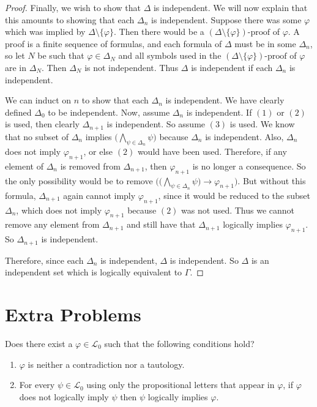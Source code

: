 \documentclass[12pt]{article}
\newenvironment{exercise}[2][Exercise]{\begin{trivlist}
\item[\hskip \labelsep {\bfseries #1}\hskip \labelsep {\bfseries #2.}]}{\end{trivlist}}
\begin{document}
\begin{proof}
Finally, we wish to show that $\Delta$ is independent.  We will now explain that this amounts to showing that each $\Delta_n$ is independent.  Suppose there was some $\varphi$ which was implied by $\Delta \setminus \{ \varphi \}$.  Then there would be a $(\Delta \setminus \{ \varphi \}) \textrm{-proof}$ of $\varphi$.  A proof is a finite sequence of formulas, and each formula of $\Delta$ must be in some $\Delta_n$, so let $N$ be such that $\varphi \in \Delta_N$ and all symbols used in the $(\Delta \setminus \{ \varphi \}) \textrm{-proof}$ of $\varphi$ are in $\Delta_N$.  Then $\Delta_N$ is not independent.  Thus $\Delta$ is independent if each $\Delta_n$ is independent.

We can induct on $n$ to show that each $\Delta_n$ is independent.  We have clearly defined $\Delta_0$ to be independent.  Now, assume $\Delta_n$ is independent.  If $(1)$ or $(2)$ is used, then clearly $\Delta_{n+1}$ is independent.  So assume $(3)$ is used.  We know that no subset of $\Delta_n$ implies $\big( \bigwedge_{\psi \in \Delta_n} \psi \big)$ because $\Delta_n$ is independent.  Also, $\Delta_n$ does not imply $\varphi_{n+1}$, or else $(2)$ would have been used.  Therefore, if any element of $\Delta_n$ is removed from $\Delta_{n+1}$, then $\varphi_{n+1}$ is no longer a consequence.  So the only possibility would be to remove $\big( \big( \bigwedge_{\psi \in \Delta_n} \psi \big) \to \varphi_{n+1} \big)$.  But without this formula, $\Delta_{n+1}$ again cannot imply $\varphi_{n+1}$, since it would be reduced to the subset $\Delta_n$, which does not imply $\varphi_{n+1}$ because $(2)$ was not used.  Thus we cannot remove any element from $\Delta_{n+1}$ and still have that $\Delta_{n+1}$ logically implies $\varphi_{n+1}$.  So $\Delta_{n+1}$ is independent.

Therefore, since each $\Delta_n$ is independent, $\Delta$ is independent.  So $\Delta$ is an independent set which is logically equivalent to $\Gamma$.

\end{proof}

\section*{Extra Problems}

\begin{exercise}{1}
Does there exist a $\varphi \in \mathcal{L}_0$ such that the following conditions hold?
\begin{enumerate}[label=\alph*)]
\item $\varphi$ is neither a contradiction nor a tautology.
\item For every $\psi \in \mathcal{L}_0$ using only the propositional letters that
appear in $\varphi$, if $\varphi$ does not logically imply $\psi$ then $\psi$ logically
implies $\varphi$.
\end{enumerate}
\end{exercise}
\end{document}
